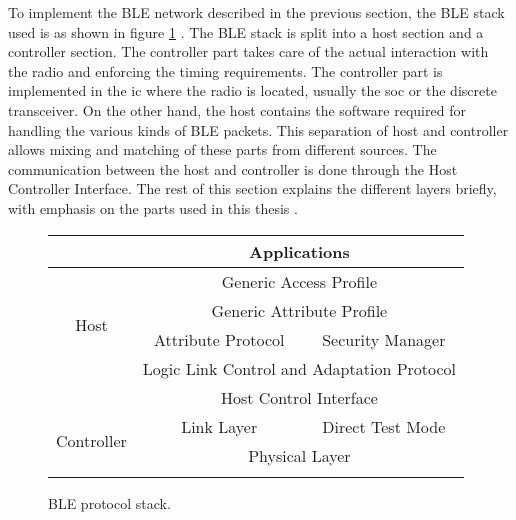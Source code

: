 To implement the BLE network described in the previous section, the BLE stack used is as shown in figure \ref{fig:StackBLE}  \cite{Heydon2012}. The BLE stack is split into a host section and a controller section. The controller part takes care of the actual interaction with the radio and enforcing the timing requirements. The controller part is implemented in the \gls{ic} where the radio is located, usually the \gls{soc} or the discrete transceiver. On the other hand, the host contains the software required for handling the various kinds of BLE packets. This separation of host and controller allows mixing and matching of these parts from different sources. The communication between the host and controller is done through the Host Controller Interface. The rest of this section explains the different layers briefly, with emphasis on the parts used in this thesis  \cite{Heydon2012}	.

\begin{figure}[b]
\begin{center}
\setlength{\extrarowheight}{1.5pt}
\begin{tabular}{|c||c|c|}
\cline{2-3}
\multicolumn{1}{c|}{} &  \multicolumn{ 2}{c|}{Applications} \\ \hline
\multirow{4}{*}{Host} & \multicolumn{ 2}{c|}{Generic Access Profile} \\ \cline{ 2- 3}
 & \multicolumn{ 2}{c|}{Generic Attribute Profile} \\ \cline{ 2- 3}
 & \multicolumn{1}{c|}{Attribute Protocol} & \multicolumn{1}{c|}{Security Manager} \\ \cline{ 2- 3}
 & \multicolumn{ 2}{c|}{Logic Link Control and Adaptation Protocol} \\ \hline 
\multicolumn{1}{c|}{} & \multicolumn{ 2}{c|}{Host Control Interface} \\ \hline
\multirow{2}{*}{Controller} & \multicolumn{1}{c|}{Link Layer} & \multicolumn{1}{c|}{Direct Test Mode} \\ \cline{ 2- 3}
 & \multicolumn{ 2}{c|}{Physical Layer} \\ \hline
\multicolumn{ 1}{c}{} & \multicolumn{1}{m{4cm}}{} & \multicolumn{1}{m{4cm}}{} \\ 
\end{tabular}
\end{center}
\vspace{-30pt}
\caption{BLE protocol stack.}
\label{fig:StackBLE}
\vspace{-10pt}
\end{figure}

